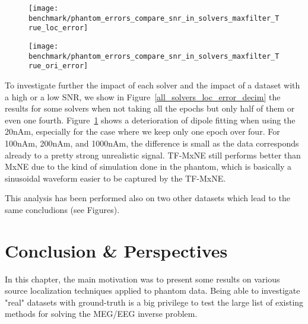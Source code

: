 \begin{sidewaysfigure}[ht]
        \centering
        \begin{subfigure}[b]{0.47\textwidth}
            \centering
            \texttt{[image: benchmark/phantom\_errors\_compare\_snr\_in\_solvers\_maxfilter\_True\_loc\_error]}
            \caption{\label{fig:all_solvers_loc_error_decim}}
        \end{subfigure}
		\hspace{25pt}
        \begin{subfigure}[b]{0.47\textwidth}  
            \centering 
            \texttt{[image: benchmark/phantom\_errors\_compare\_snr\_in\_solvers\_maxfilter\_True\_ori\_error]}
            \caption{\label{fig:all_solvers_ori_error_decim}}
        \end{subfigure}

		\caption{Comparison of the position and the orientation error between come solvers when taking only part of the epochs to reduce the SNR..\label{all_solvers_loc_error_decim}}
\end{sidewaysfigure}

To investigate further the impact of each solver and the impact of a dataset with a high or a low SNR, we show in Figure~\ref{all_solvers_loc_error_decim} the results for some solvers when not taking all the epochs but only half of them or even one fourth. Figure~\ref{fig:all_solvers_loc_error_decim} shows a deterioration of dipole fitting when using the 20nAm, especially for the case where we keep only one epoch over four. For 100nAm, 200nAm, and 1000nAm, the difference is small as the data corresponds already to a pretty strong unrealistic signal. TF-MxNE still performs better than MxNE due to the kind of simulation done in the phantom, which is basically a sinusoidal waveform easier to be captured by the TF-MxNE.

This analysis has been performed also on two other datasets which lead to the same concludions (see Figures).

\section{Conclusion \& Perspectives}
In this chapter, the main motivation was to present some results on various source localization techniques applied to phantom data. Being able to investigate "real" datasets with ground-truth is a big privilege to test the large list of existing methods for solving the MEG/EEG inverse problem.

